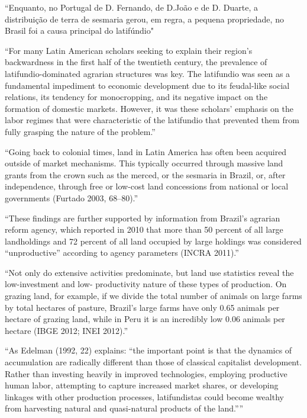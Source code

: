 \documentclass{article}
\begin{document}
\textcite[p.~58-59]{Da_Costa_Porto1979-dz} ``Enquanto, no Portugal de D. Fernando, de D.João e de D. Duarte, a distribuição de terra de sesmaria gerou, em regra, a pequena propriedade, no Brasil foi a causa principal do latifúndio"

\parencite{Carlson2019-mk}
``For many Latin American scholars seeking to explain their region’s backwardness in the first half of the  twentieth century, the prevalence of latifundio-dominated agrarian structures was key. The latifundio was  seen  as  a  fundamental  impediment  to  economic  development  due  to  its  feudal-like  social  relations,  its   tendency for monocropping, and its negative impact on the formation of domestic markets. However, it  was these scholars’ emphasis on the labor regimes that were characteristic of the latifundio that prevented  them from fully grasping the nature of the problem.''

\parencite{Carlson2019-mk}
``Going back to colonial times, land in Latin America has often been acquired outside of market mechanisms.  This typically occurred through massive land grants from the crown such as the merced, or the sesmaria in  Brazil, or, after independence, through free or low-cost land concessions from national or local governments  (Furtado  2003,  68–80).''

\parencite{Carlson2019-mk}
``These findings are further supported by information from Brazil’s agrarian reform 
agency, which reported in 2010 that more than 50 percent of all large landholdings and 72 percent of all  land  occupied  by  large  holdings  was  considered  “unproductive”  according  to  agency  parameters  (INCRA   2011).''

\parencite{Carlson2019-mk}
``Not only do extensive activities predominate, but land use statistics reveal the low-investment and low- productivity nature of these types of production. On grazing land, for example, if we divide the total number  of animals on large farms by total hectares of pasture, Brazil’s large farms have only 0.65 animals per hectare  of grazing land, while in Peru it is an incredibly low 0.06 animals per hectare (IBGE 2012; INEI 2012).''

\parencite{Carlson2019-mk}
``As Edelman (1992, 22) explains: “the important point is that the dynamics of accumulation are 
radically different than those of classical capitalist development. Rather than investing heavily in improved  technologies,  employing  productive  human  labor,  attempting  to  capture  increased  market  shares,  or   developing linkages with other production processes, latifundistas could become wealthy from harvesting  natural and quasi-natural products of the land.”''
\end{document}
